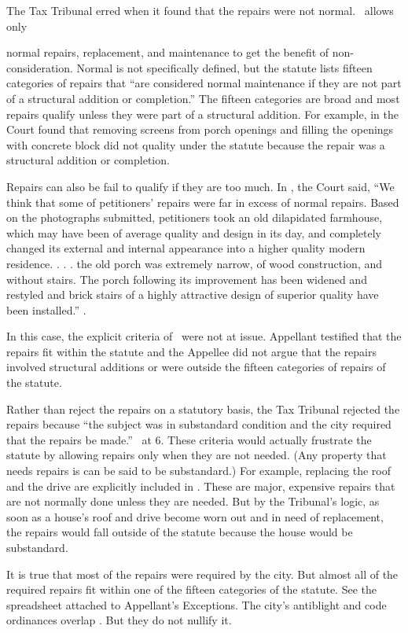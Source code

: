 \documentclass[12pt,\documentclassflag]{michiganCourtOfAppealsBrief}
\def\mathieuGast{\pincite[l]{MCL}{211.27(2)}}
\begin{document}
The Tax Tribunal erred when it found that the repairs were not normal. \mathieuGast\ allows only {normal repairs, replacement, and maintenance to get the benefit of non-consideration. Normal is not specifically defined, but the statute lists fifteen categories of repairs that ``are considered normal maintenance if they are not part of a structural addition or completion.'' The fifteen categories are broad and most repairs qualify unless they were part of a structural addition. For example, in \cite{Coyne} the Court found that removing screens from porch openings and filling the openings with concrete block did not quality under the statute because the repair was a structural addition or completion.

  Repairs can also be fail to qualify if they are too much. In \cite{Fisher}, the Court said, ``We think that some of petitioners' repairs were far in excess of normal repairs. Based on the photographs submitted, petitioners took an old dilapidated farmhouse, which may have been of average quality and design in its day, and completely changed its external and internal appearance into a higher quality modern residence. . . . the old porch was extremely narrow, of wood construction, and without stairs. The porch following its improvement has been widened and restyled and brick stairs of a highly attractive design of superior quality have been installed.'' .

  In this case, the explicit criteria of \mathieuGast\ were not at issue. Appellant testified that the repairs fit within the statute and the Appellee did not argue that the repairs involved structural additions or were outside the fifteen categories of repairs of the statute.

  Rather than reject the repairs on a statutory basis, the Tax Tribunal rejected the repairs because ``the subject was in substandard condition and the city required that the repairs be made.'' \POJ\ at 6. These criteria would actually frustrate the statute by allowing repairs only when they are not needed. (Any property that needs repairs is can be said to be substandard.) For example, replacing the roof and the drive are explicitly included in . These are major, expensive repairs that are not normally done unless they are needed. But by the Tribunal's logic, as soon as a house's roof and drive become worn out and in need of replacement, the repairs would fall outside of the statute because the house would be substandard.

It is true that most of the repairs were required by the city. But almost all of the required repairs fit within one of the fifteen categories of the statute. See the spreadsheet attached to Appellant's Exceptions. The city's antiblight and code ordinances overlap \mathieuGast. But they do not nullify it.

}
\end{document}
